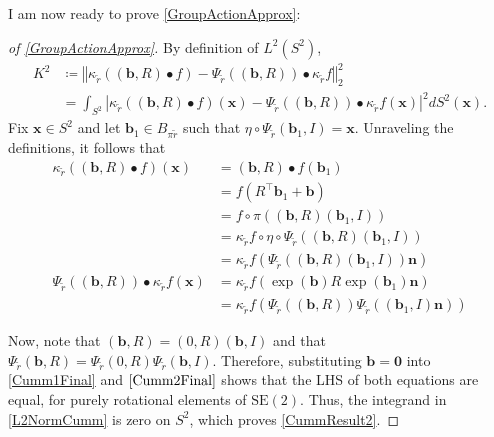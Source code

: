 \documentclass[a4paper,11pt]{scrartcl}
\numberwithin{dummy}{section}
\theoremstyle{plain}
\theoremstyle{plain}
\theoremstyle{plain}
\theoremstyle{plain}
\theoremstyle{nonumberplain}
\newtheorem{proof}{Proof}
\newcommand{\Ltwonorm}[1]{\left\Vert #1 \right\Vert} %
\newcommand{\SE}{\mathrm{SE}}
\begin{document}
	I am now ready to prove \cref{GroupActionApprox}:
	\begin{proof}[of \cref{GroupActionApprox}]
		By definition of $ L^{2} (S^{2}) $, 
		\begin{equation}
		\label{L2NormCumm}
		\begin{aligned}
		K^{2}
		&\coloneqq \Ltwonorm{\kappa_{\widetilde{r}} \left( (\mathbf{b}, R) \bullet f \right) - \Psi_{\widetilde{r}} ((\mathbf{b}, R)) \bullet \kappa_{\widetilde{r}} f }_{2}^{2} \\
		&= \int_{S^{2}} \left| \kappa_{\widetilde{r}} \left( (\mathbf{b}, R) \bullet f \right) (\mathbf{x}) - \Psi_{\widetilde{r}} ((\mathbf{b}, R)) \bullet \kappa_{\widetilde{r}} f (\mathbf{x}) \right|^{2} dS^{2} (\mathbf{x}).
		\end{aligned}
		\end{equation}
		Fix $ \mathbf{x} \in S^{2} $ and let $ \mathbf{b}_{1} \in B_{\pi \widetilde{r}} $ such that $ \eta \circ \Psi_{\widetilde{r}} (\mathbf{b}_{1}, I) = \mathbf{x} $. Unraveling the definitions, it follows that
		\begin{align}
		\nonumber
		\kappa_{\widetilde{r}} \left( (\mathbf{b}, R) \bullet f\right) (\mathbf{x})
		&= (\mathbf{b}, R) \bullet f ( \mathbf{b}_{1}) \\
		\nonumber
		&= f (R^{\top} \mathbf{b}_{1} + \mathbf{b}) \\
		\nonumber
		&= f \circ \pi \left( (\mathbf{b}, R) (\mathbf{b}_{1}, I) \right) \\
		&= \kappa_{\widetilde{r}} f \circ \eta \circ \Psi_{\widetilde{r}} \left( (\mathbf{b}, R) (\mathbf{b}_{1}, I) \right)
		\nonumber \\
		\label{Cumm1Final} 
		&= \kappa_{\widetilde{r}} f \left( \Psi_{\widetilde{r}} \left( (\mathbf{b}, R) (\mathbf{b}_{1}, I) \right) \mathbf{n} \right) \\
		\nonumber
		\Psi_{\widetilde{r}} ((\mathbf{b}, R)) \bullet \kappa_{\widetilde{r}} f (\mathbf{x})
		&= \kappa_{\widetilde{r}} f( \exp (\mathbf{b} ) R \exp(\mathbf{b}_{1}) \mathbf{n} ) \\
		&= \kappa_{\widetilde{r}} f \left( \Psi_{\widetilde{r}} ((\mathbf{b}, R)) \Psi_{\widetilde{r}}  ((\mathbf{b}_{1}, I) \mathbf{n}) \right)
		\label{Cumm2Final}
		\end{align}
		
		Now, note that $ (\mathbf{b}, R) = (0, R) (\mathbf{b}, I) $ and that $ \Psi_{\widetilde{r}} (\mathbf{b}, R) = \Psi_{\widetilde{r}} (0, R) \Psi_{\widetilde{r}} (\mathbf{b}, I) $. Therefore, substituting $ \mathbf{b} = \mathbf{0} $ into \eqref{Cumm1Final} and $ \eqref{Cumm2Final} $ shows that the LHS of both equations are equal, for purely rotational elements of $ \SE(2) $. Thus, the integrand in \eqref{L2NormCumm} is zero on $ S^{2} $, which proves \eqref{CummResult2}.
		

\end{proof}
\end{document}

